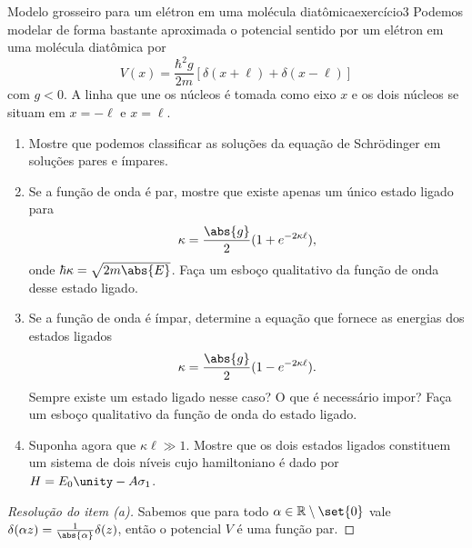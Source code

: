 \begin{exercício}{Modelo grosseiro para um elétron em uma molécula diatômica}{exercício3}
    Podemos modelar de forma bastante aproximada o potencial sentido por um elétron em uma molécula diatômica por
    \begin{equation*}
        V(x) = \frac{\hbar^2 g}{2m}\left[\delta(x + \ell) + \delta(x - \ell)\right]
    \end{equation*}
    com \(g < 0\). A linha que une os núcleos é tomada como eixo \(x\) e os dois núcleos se situam em \(x = -\ell\) e \(x = \ell\).
    \begin{enumerate}[label=(\alph*)]
        \item Mostre que podemos classificar as soluções da equação de Schrödinger em soluções pares e ímpares.
        \item Se a função de onda é par, mostre que existe apenas um único estado ligado para
            \begin{equation*}
                \kappa = \frac{\abs{g}}{2}(1 + e^{-2 \kappa \ell}),
            \end{equation*}
            onde \(\hbar \kappa = \sqrt{2 m \abs{E}}\). Faça um esboço qualitativo da função de onda desse estado ligado.
        \item Se a função de onda é ímpar, determine a equação que fornece as energias dos estados ligados
            \begin{equation*}
                \kappa = \frac{\abs{g}}{2}(1 - e^{-2 \kappa \ell}).
            \end{equation*}
            Sempre existe um estado ligado nesse caso? O que é necessário impor? Faça um esboço qualitativo da função de onda do estado ligado.
        \item Suponha agora que \(\kappa \ell \gg 1\). Mostre que os dois estados ligados constituem um sistema de dois níveis cujo hamiltoniano é dado por \(H = E_0 \unity - A \sigma_1\).
    \end{enumerate}
\end{exercício}
\begin{proof}[Resolução do item (a)]
    Sabemos que para todo \(\alpha \in \mathbb{R}\setminus\set{0}\) vale \(\delta(\alpha z) = \frac{1}{\abs{\alpha}} \delta(z)\), então o potencial \(V\) é uma função par.
\end{proof}
